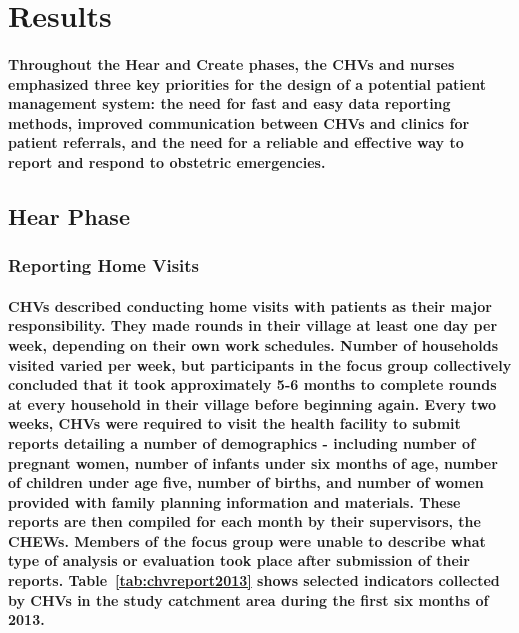 \section{Results}
\paragraph{Throughout the Hear and Create phases, the CHVs and nurses emphasized three key priorities for the design of a potential patient management system: the need for fast and easy data reporting methods, improved communication between CHVs and clinics for patient referrals, and the need for a reliable and effective way to report and respond to obstetric emergencies.}

\subsection{Hear Phase}
\subsubsection{Reporting Home Visits}
\paragraph{CHVs described conducting home visits with patients as their major responsibility. They made rounds in their village at least one day per week, depending on their own work schedules. Number of households visited varied per week, but participants in the focus group collectively concluded that it took approximately 5-6 months to complete rounds at every household in their village before beginning again. Every two weeks, CHVs were required to visit the health facility to submit reports detailing a number of demographics - including number of pregnant women, number of infants under six months of age, number of children under age five, number of births, and number of women provided with family planning information and materials. These reports are then compiled for each month by their supervisors, the CHEWs. Members of the focus group were unable to describe what type of analysis or evaluation took place after submission of their reports. Table~\ref{tab:chvreport2013} shows selected indicators collected by CHVs in the study catchment area during the first six months of 2013. }

